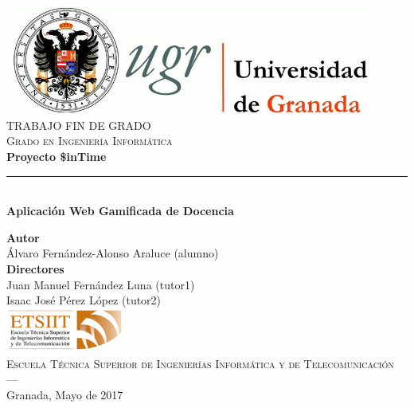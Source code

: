 \begin{titlepage}
 
\newlength{\centeroffset}
\setlength{\centeroffset}{-0.5\oddsidemargin}
\addtolength{\centeroffset}{0.5\evensidemargin}
\thispagestyle{empty}

\noindent\hspace*{\centeroffset}\begin{minipage}{\textwidth}

\centering
\includegraphics[width=0.9\textwidth]{imagenes/logo_ugr.jpg}\\[1.4cm]

\textsc{ \Large TRABAJO FIN DE GRADO\\[0.2cm]}
\textsc{ Grado en Ingeniería Informática }\\[1cm]
% 
{\Huge\bfseries Proyecto \$inTime\\
}
\noindent\rule[-1ex]{\textwidth}{3pt}\\[3.5ex]
{\large\bfseries Aplicación Web Gamificada de Docencia}
\end{minipage}

\vspace{2.5cm}
\noindent\hspace*{\centeroffset}\begin{minipage}{\textwidth}
\centering

\textbf{Autor}\\ {Álvaro Fernández-Alonso Araluce (alumno)}\\[2.5ex]
\textbf{Directores}\\
{Juan Manuel Fernández Luna (tutor1)\\
Isaac José Pérez López (tutor2)}\\[2cm]
\includegraphics[width=0.3\textwidth]{imagenes/etsiit_logo.png}\\[0.1cm]
\textsc{Escuela Técnica Superior de Ingenierías Informática y de Telecomunicación}\\
\textsc{---}\\
Granada, Mayo de 2017
\end{minipage}
\end{titlepage}



